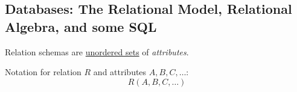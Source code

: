 \subsection{Databases: The Relational Model, Relational Algebra, and some SQL}%
\label{sub:relational-algebra}

\begin{multicols}{2}






    \begin{CheatsheetEntryFrame}


        Relation schemas are \ul{unordered sets} of \textit{attributes}.

        Notation for relation $R$ and attributes $A, B, C, \dots$:
        \begin{equation*}
            R(A, B, C, \dots)
        \end{equation*}


\end{CheatsheetEntryFrame}
\end{multicols}

